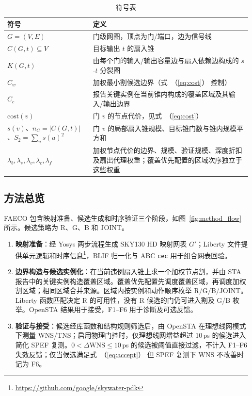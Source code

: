 \documentclass[twocolumn,10pt,fontset=windows]{ctexart}
\renewcommand{\eqref}[1]{\textup{（\ref{#1}）}}
\begin{document}
\begin{table}[ht]
\centering
\caption{符号表}
\label{tab:symbols}
\scriptsize
\setlength{\tabcolsep}{2pt}
\renewcommand{\arraystretch}{0.9}
\begin{tabular}{p{2.6cm}p{4.9cm}}
\toprule
\textbf{符号} & \textbf{定义} \\
\midrule
$G = (V, E)$ & 门级网图，顶点为门/端口，边为信号线 \\
$C(G, t) \subseteq V$ & 目标输出 $t$ 的扇入锥 \\
$K(G, t)$ & 由每个门的输入/输出容量边与扇入依赖边构成的 $s$-$t$ 分裂图 \\
$C_w$ & 加权最小割候选边界（式~\eqref{eq:cost} 控制） \\
$C_c$ & 报告关键实例在当前锥内构成的覆盖区域及其输入/输出边界 \\
$\mathrm{cost}(v)$ & 门 $v$ 的节点代价，见式~\eqref{eq:cost} \\
$s(v)$、$n_C=|C(G,t)|$、$S_2=\sum_u s(u)^2$ & 门 $v$ 的局部扇入锥规模、目标锥门数与锥内规模平方和 \\
$\lambda_b,\lambda_s,\lambda_v,\lambda_c,\lambda_f$ & 加权节点代价的边界、规模、验证规模、深度折扣及扇出代理权重；覆盖优先配置的区域次序独立于这些权重 \\
\bottomrule
\end{tabular}
\end{table}

\subsection{方法总览}\label{sec:overview}

FAECO 包含映射准备、候选生成和时序验证三个阶段，如图~\ref{fig:method_flow} 所示。候选策略为 R、G、B 和 JOINT。

\begin{enumerate}
  \item[(a)] \textbf{映射准备}：经 Yosys 两步流程生成 SKY130 HD 映射网表 $G'$；Liberty 文件提供单元逻辑和时序信息\footnote{\url{https://github.com/google/skywater-pdk}}，BLIF 归一化与 ABC \texttt{cec}\cite{abc} 用于组合网表回验。
  \item[(b)] \textbf{边界构造与候选实例化}：在当前违例扇入锥上求一个加权节点割，并由 STA 报告中的关键实例构造覆盖区域。覆盖优先配置先调度覆盖区域，再调度加权割区域；相同区域合并来源。区域内按实例和动作顺序枚举 R/G/B/JOINT。Liberty 函数匹配决定 R 的可用性，没有 R 候选的门仍可进入割及 G/B 枚举。OpenSTA 结果用于接受，F1--F6 用于诊断及可选反馈。
  \item[(c)] \textbf{验证与接受}：候选经库函数和结构规则筛选后，由 OpenSTA 在理想线网模式下测量 WNS/TNS；启用物理门控时，仅理想线网增益超过 10\,ps 的候选进入简化 SPEF 复测。$0<\Delta\mathrm{WNS}\le10\,$ps 的候选被阈值直接过滤，不计入 F1--F6 失效反馈；仅当候选满足式~\eqref{eq:accept} 但 SPEF 复测下 WNS 不改善时记为 F6。
\end{enumerate}
\end{document}
